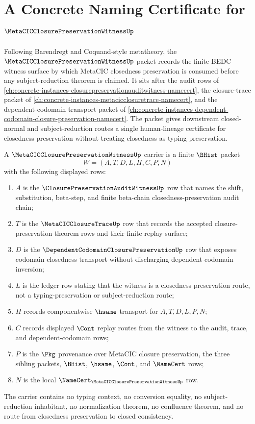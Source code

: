 \chapter{A Concrete Naming Certificate for $\MetaCICClosurePreservationWitnessUp$}
\label{ch:concrete-instances-metacic-closure-preservation-witness-namecert}

Following Barendregt and Coquand-style metatheory, the $\MetaCICClosurePreservationWitnessUp$ packet records the finite BEDC witness surface by which MetaCIC closedness preservation is consumed before any subject-reduction theorem is claimed. It sits after the audit rows of \autoref{ch:concrete-instances-closurepreservationauditwitness-namecert}, the closure-trace packet of \autoref{ch:concrete-instances-metacicclosuretrace-namecert}, and the dependent-codomain transport packet of \autoref{ch:concrete-instances-dependent-codomain-closure-preservation-namecert}. The packet gives downstream closed-normal and subject-reduction routes a single human-lineage certificate for closedness preservation without treating closedness as typing preservation.

\begin{definition}
\label{def:metacic-closure-preservation-witness-carrier}
A $\MetaCICClosurePreservationWitnessUp$ carrier is a finite $\BHist$ packet
$$
W=(A,T,D,L,H,C,P,N)
$$
with the following displayed rows:
\begin{enumerate}
\item $A$ is the $\ClosurePreservationAuditWitnessUp$ row that names the shift, substitution, beta-step, and finite beta-chain closedness-preservation audit chain;
\item $T$ is the $\MetaCICClosureTraceUp$ row that records the accepted closure-preservation theorem rows and their finite replay surface;
\item $D$ is the $\DependentCodomainClosurePreservationUp$ row that exposes codomain closedness transport without discharging dependent-codomain inversion;
\item $L$ is the ledger row stating that the witness is a closedness-preservation route, not a typing-preservation or subject-reduction route;
\item $H$ records componentwise $\hsame$ transport for $A,T,D,L,P,N$;
\item $C$ records displayed $\Cont$ replay routes from the witness to the audit, trace, and dependent-codomain rows;
\item $P$ is the $\Pkg$ provenance over MetaCIC closure preservation, the three sibling packets, $\BHist$, $\hsame$, $\Cont$, and $\NameCert$ rows;
\item $N$ is the local $\NameCert_{\MetaCICClosurePreservationWitnessUp}$ row.
\end{enumerate}
The carrier contains no typing context, no conversion equality, no subject-reduction inhabitant, no normalization theorem, no confluence theorem, and no route from closedness preservation to closed consistency.
\end{definition}

